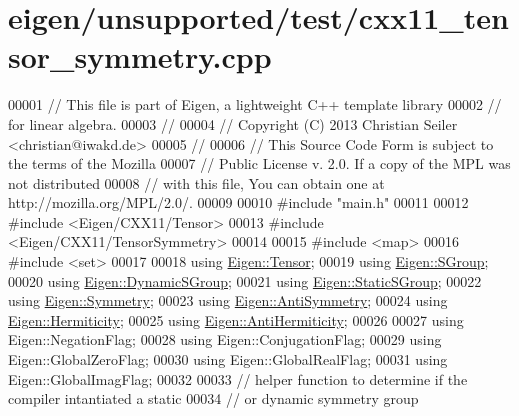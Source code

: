 \hypertarget{eigen_2unsupported_2test_2cxx11__tensor__symmetry_8cpp_source}{}\section{eigen/unsupported/test/cxx11\+\_\+tensor\+\_\+symmetry.cpp}
\label{eigen_2unsupported_2test_2cxx11__tensor__symmetry_8cpp_source}

\begin{DoxyCode}
00001 \textcolor{comment}{// This file is part of Eigen, a lightweight C++ template library}
00002 \textcolor{comment}{// for linear algebra.}
00003 \textcolor{comment}{//}
00004 \textcolor{comment}{// Copyright (C) 2013 Christian Seiler <christian@iwakd.de>}
00005 \textcolor{comment}{//}
00006 \textcolor{comment}{// This Source Code Form is subject to the terms of the Mozilla}
00007 \textcolor{comment}{// Public License v. 2.0. If a copy of the MPL was not distributed}
00008 \textcolor{comment}{// with this file, You can obtain one at http://mozilla.org/MPL/2.0/.}
00009 
00010 \textcolor{preprocessor}{#include "main.h"}
00011 
00012 \textcolor{preprocessor}{#include <Eigen/CXX11/Tensor>}
00013 \textcolor{preprocessor}{#include <Eigen/CXX11/TensorSymmetry>}
00014 
00015 \textcolor{preprocessor}{#include <map>}
00016 \textcolor{preprocessor}{#include <set>}
00017 
00018 \textcolor{keyword}{using} \hyperlink{class_eigen_1_1_tensor}{Eigen::Tensor};
00019 \textcolor{keyword}{using} \hyperlink{class_eigen_1_1_s_group}{Eigen::SGroup};
00020 \textcolor{keyword}{using} \hyperlink{class_eigen_1_1_dynamic_s_group}{Eigen::DynamicSGroup};
00021 \textcolor{keyword}{using} \hyperlink{class_eigen_1_1_static_s_group}{Eigen::StaticSGroup};
00022 \textcolor{keyword}{using} \hyperlink{struct_eigen_1_1_symmetry}{Eigen::Symmetry};
00023 \textcolor{keyword}{using} \hyperlink{struct_eigen_1_1_anti_symmetry}{Eigen::AntiSymmetry};
00024 \textcolor{keyword}{using} \hyperlink{struct_eigen_1_1_hermiticity}{Eigen::Hermiticity};
00025 \textcolor{keyword}{using} \hyperlink{struct_eigen_1_1_anti_hermiticity}{Eigen::AntiHermiticity};
00026 
00027 \textcolor{keyword}{using} Eigen::NegationFlag;
00028 \textcolor{keyword}{using} Eigen::ConjugationFlag;
00029 \textcolor{keyword}{using} Eigen::GlobalZeroFlag;
00030 \textcolor{keyword}{using} Eigen::GlobalRealFlag;
00031 \textcolor{keyword}{using} Eigen::GlobalImagFlag;
00032 
00033 \textcolor{comment}{// helper function to determine if the compiler intantiated a static}
00034 \textcolor{comment}{// or dynamic symmetry group}

\end{DoxyCode}
